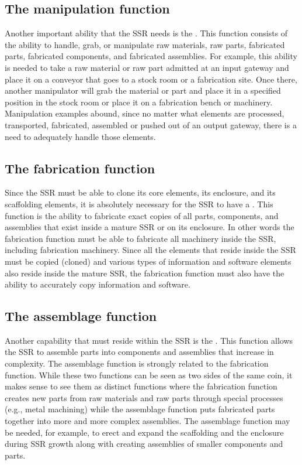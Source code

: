 \subsection[The manipulation function]{The manipulation function}
Another important ability that the SSR needs is the
. This
function consists of the ability to handle, grab, or manipulate raw
materials, raw parts, fabricated parts, fabricated components, and
fabricated assemblies. For example, this ability is needed
to take a raw material or raw part admitted at an input gateway and
place it on a conveyor that goes to a stock room or a
fabrication site. Once there, another manipulator will grab the material or
part and place it in a specified position in the stock room or place it
on a fabrication bench or machinery. Manipulation examples abound,
since no matter what elements are processed, transported, fabricated,
assembled or pushed out of an output gateway, there is a need to
adequately handle those elements.

\subsection[The fabrication function]{The fabrication function}

Since the SSR must be able to
clone its core elements, its enclosure, and its scaffolding elements,
it is absolutely necessary for the SSR to have a . 
This function is the ability to fabricate exact copies of
all parts, components, and assemblies that exist inside a mature SSR
or on its enclosure. In other words the fabrication function must be
able to fabricate all machinery inside the SSR, including fabrication
machinery. Since all the elements that reside inside the SSR must be
copied (cloned) and various types of information and software elements
also reside inside the mature SSR, 
the fabrication function must also have the ability to
accurately copy information and software.

\subsection[The assemblage function]{The assemblage function}

Another capability that must
reside within the SSR is the . This function allows
the SSR to assemble parts into
components and assemblies that increase in complexity. The assemblage
function is strongly related to the fabrication function. While these two
functions can be seen as two sides of the same coin, it makes sense
to see them as distinct functions where the fabrication function
creates new parts from raw materials and raw parts through special
processes (e.g., metal machining) while the assemblage function puts
fabricated parts together into more and more complex assemblies.
The assemblage function may be needed, for example,
to erect and expand the scaffolding and the enclosure during SSR
growth along with creating assemblies of smaller components
and parts.

